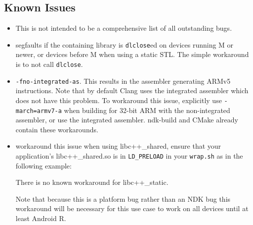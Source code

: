 \hypertarget{known-issues}{%
\subsection{Known Issues}\label{known-issues}}

\begin{itemize}
\item
  This is not intended to be a comprehensive list of all outstanding
  bugs.
\item
  segfaults if the containing library is \texttt{dlclose}ed on devices
  running M or newer, or devices before M when using a static STL. The
  simple workaround is to not call \texttt{dlclose}.
\item
  \texttt{-fno-integrated-as}. This results in the assembler generating
  ARMv5 instructions. Note that by default Clang uses the integrated
  assembler which does not have this problem. To workaround this issue,
  explicitly use \texttt{-march=armv7-a} when building for 32-bit ARM
  with the non-integrated assembler, or use the integrated assembler.
  ndk-build and CMake already contain these workarounds.
\item
  workaround this issue when using libc++\_shared, ensure that your
  application's libc++\_shared.so is in \texttt{LD\_PRELOAD} in your
  \texttt{wrap.sh} as in the following example:

\begin{Shaded}
\begin{Highlighting}[]
\VariableTok{$(} \VariableTok{$(} \VariableTok{)} \KeywordTok{\&\&} \VariableTok{)}
 \VariableTok{=}\VariableTok{=}
 \VariableTok{)}
\BuiltInTok{ [}  \BuiltInTok{ ]}\NormalTok{; }
     \StringTok{ }
     
\end{Highlighting}
\end{Shaded}

  There is no known workaround for libc++\_static.

  Note that because this is a platform bug rather than an NDK bug this
  workaround will be necessary for this use case to work on all devices
  until at least Android R.
\end{itemize}
